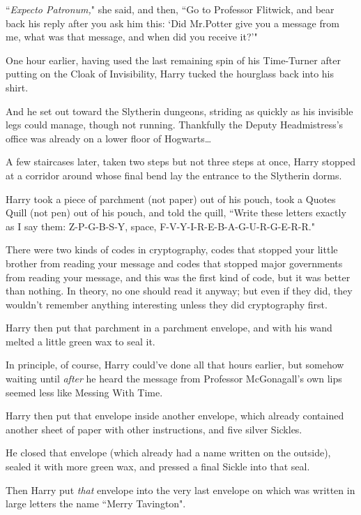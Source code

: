 ``\emph{Expecto Patronum,}" she said, and then, ``Go to Professor Flitwick, and bear back his reply after you ask him this: `Did Mr.\?Potter give you a message from me, what was that message, and when did you receive it?'"

\later

One hour earlier, having used the last remaining spin of his Time-Turner after putting on the Cloak of Invisibility, Harry tucked the hourglass back into his shirt.

And he set out toward the Slytherin dungeons, striding as quickly as his invisible legs could manage, though not running. Thankfully the Deputy Headmistress's office was already on a lower floor of Hogwarts{\ldots}

A few staircases later, taken two steps but not three steps at once, Harry stopped at a corridor around whose final bend lay the entrance to the Slytherin dorms.

Harry took a piece of parchment (not paper) out of his pouch, took a Quotes Quill (not pen) out of his pouch, and told the quill, ``Write these letters exactly as I say them: Z-P-G-B-S-Y, space, F-V-Y-I-R-E-B-A-G-U-R-G-E-R-R."

There were two kinds of codes in cryptography, codes that stopped your little brother from reading your message and codes that stopped major governments from reading your message, and this was the first kind of code, but it was better than nothing. In theory, no one should read it anyway; but even if they did, they wouldn't remember anything interesting unless they did cryptography first.

Harry then put that parchment in a parchment envelope, and with his wand melted a little green wax to seal it.

In principle, of course, Harry could've done all that hours earlier, but somehow waiting until \emph{after} he heard the message from Professor McGonagall's own lips seemed less like Messing With Time.

Harry then put that envelope inside another envelope, which already contained another sheet of paper with other instructions, and five silver Sickles.

He closed that envelope (which already had a name written on the outside), sealed it with more green wax, and pressed a final Sickle into that seal.

Then Harry put \emph{that} envelope into the very last envelope on which was written in large letters the name ``Merry Tavington".

